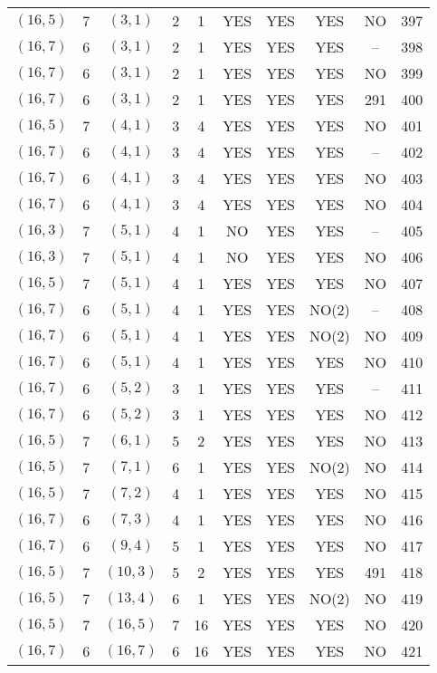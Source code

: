 \begin{longtable}{|c|c|c|c|c|c|c|c|c|c|}
$(16, 5)$ & 7 & $(3, 1)$ & 2 & 1 & YES & YES & YES & NO & 397\\
$(16, 7)$ & 6 & $(3, 1)$ & 2 & 1 & YES & YES & YES & -- & 398\\
$(16, 7)$ & 6 & $(3, 1)$ & 2 & 1 & YES & YES & YES & NO & 399\\
$(16, 7)$ & 6 & $(3, 1)$ & 2 & 1 & YES & YES & YES & 291 & 400\\
$(16, 5)$ & 7 & $(4, 1)$ & 3 & 4 & YES & YES & YES & NO & 401\\
$(16, 7)$ & 6 & $(4, 1)$ & 3 & 4 & YES & YES & YES & -- & 402\\
$(16, 7)$ & 6 & $(4, 1)$ & 3 & 4 & YES & YES & YES & NO & 403\\
$(16, 7)$ & 6 & $(4, 1)$ & 3 & 4 & YES & YES & YES & NO & 404\\
$(16, 3)$ & 7 & $(5, 1)$ & 4 & 1 & NO & YES & YES & -- & 405\\
$(16, 3)$ & 7 & $(5, 1)$ & 4 & 1 & NO & YES & YES & NO & 406\\
$(16, 5)$ & 7 & $(5, 1)$ & 4 & 1 & YES & YES & YES & NO & 407\\
$(16, 7)$ & 6 & $(5, 1)$ & 4 & 1 & YES & YES & NO(2) & -- & 408\\
$(16, 7)$ & 6 & $(5, 1)$ & 4 & 1 & YES & YES & NO(2) & NO & 409\\
$(16, 7)$ & 6 & $(5, 1)$ & 4 & 1 & YES & YES & YES & NO & 410\\
$(16, 7)$ & 6 & $(5, 2)$ & 3 & 1 & YES & YES & YES & -- & 411\\
$(16, 7)$ & 6 & $(5, 2)$ & 3 & 1 & YES & YES & YES & NO & 412\\
$(16, 5)$ & 7 & $(6, 1)$ & 5 & 2 & YES & YES & YES & NO & 413\\
$(16, 5)$ & 7 & $(7, 1)$ & 6 & 1 & YES & YES & NO(2) & NO & 414\\
$(16, 5)$ & 7 & $(7, 2)$ & 4 & 1 & YES & YES & YES & NO & 415\\
$(16, 7)$ & 6 & $(7, 3)$ & 4 & 1 & YES & YES & YES & NO & 416\\
$(16, 7)$ & 6 & $(9, 4)$ & 5 & 1 & YES & YES & YES & NO & 417\\
$(16, 5)$ & 7 & $(10, 3)$ & 5 & 2 & YES & YES & YES & 491 & 418\\
$(16, 5)$ & 7 & $(13, 4)$ & 6 & 1 & YES & YES & NO(2) & NO & 419\\
$(16, 5)$ & 7 & $(16, 5)$ & 7 & 16 & YES & YES & YES & NO & 420\\
$(16, 7)$ & 6 & $(16, 7)$ & 6 & 16 & YES & YES & YES & NO & 421\\

\end{longtable}
